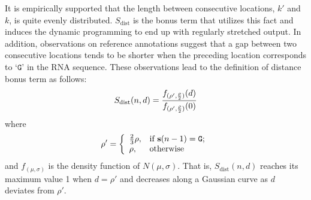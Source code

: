 It is empirically supported that the length between consecutive locations, $k'$ and $k$, is quite evenly distributed. $S_{\textrm{dist}}$ is the bonus term that utilizes this fact and induces the dynamic programming to end up with regularly stretched output. In addition, observations on reference annotations suggest that a gap between two consecutive locations tends to be shorter when the preceding location corresponds to  `$\mathtt{G}$' in the RNA sequence. These observations lead to the definition of distance bonus term as follows:
%
\begin{equation}
S_{\textrm{dist}} (n,d) = {{f_{(\rho', {\rho \over 2})}(d)} \over {f_{(\rho', {\rho \over 2})}(0)}}
\end{equation}
%
where
%
\begin{equation}\nonumber
\rho' = \left\{
  \begin{array}{ll}
    {2 \over 3}\rho, &\hbox{if ${\mathbf{s}}(n-1)=\mathtt{G}$;} \\
    \rho, &\hbox{otherwise}
  \end{array}
\right.
\end{equation}
%
and $f_{(\mu, \sigma)}$ is the density function of $N(\mu, \sigma)$. That is, $S_{\textrm{dist}}(n,d)$ reaches its maximum value 1 when $d = \rho'$ and decreases along a Gaussian curve as $d$ deviates from $\rho'$.


